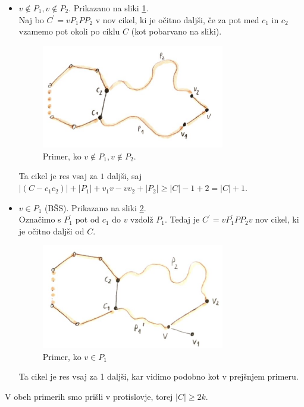 \documentclass[a4paper,11pt]{article}
\begin{document}
\begin{itemize}
    \item $v \notin P_1, v \notin P_2$. Prikazano na sliki \ref{pot1}.
        \\
        Naj bo $C^{'} = v P_1 P P_2$ v nov cikel, ki je očitno daljši, če za pot med $c_1$ in $c_2$ vzamemo pot okoli po ciklu $C$ (kot pobarvano na sliki).
        \begin{figure}[ht!]
            \centering
            \includegraphics[width=80mm]{3_1.png}
            \caption{Primer, ko $v \notin P_1, v \notin P_2$.}\label{pot1}
        \end{figure}
        Ta cikel je res vsaj za $1$ daljši, saj $|(C - c_1c_2)| + |P_1| + v_1v - vv_2 + |P_2| \geq |C| - 1 + 2 = |C| + 1$.

    \item $v \in P_1$ (BŠS). Prikazano na sliki \ref{pot2}.
        \\
        Označimo s $P_1^{'}$ pot od $c_1$ do $v$ vzdolž $P_1$. Tedaj je $C^{'} = v P_1^{'} P P_2 v$ nov cikel, ki je očitno daljši od $C$. 
        \begin{figure}[ht!]
            \centering
            \includegraphics[width=80mm]{3_2.png}
            \caption{Primer, ko $v \in P_1$}\label{pot2}
        \end{figure}
        Ta cikel je res vsaj za 1 daljši, kar vidimo podobno kot v prejšnjem primeru.

\end{itemize}
V obeh primerih smo prišli v protislovje, torej $|C| \geq 2k$.
\end{document}

